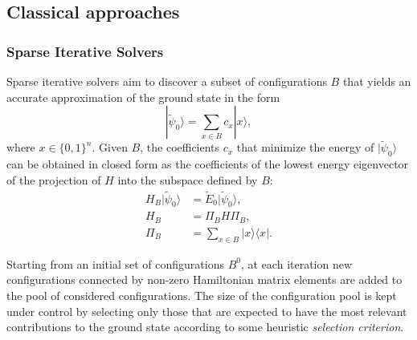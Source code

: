 \documentclass[
  reprint,            %
  amsmath,amssymb,
  aps,
  superscriptaddress, %
  longbibliography
]{revtex4-2}
\theoremstyle{definition}
\begin{document}
\subsection{Classical approaches}
\label{sec:classical_approaches}


\subsubsection{Sparse Iterative Solvers}
\label{sec:sis_intro}

Sparse iterative solvers aim to discover a subset of configurations $B$ that yields an accurate approximation of the ground state in the form
\begin{equation}
    |\tilde{\psi}_0\rangle = \sum_{x \in B} c_x | x\rangle,
\end{equation}
where $x\in\{0, 1\}^n$. Given $B$, the coefficients $c_x$ that minimize the energy of $|\tilde{\psi}_0\rangle$ can be obtained in closed form as the coefficients of the lowest energy eigenvector of the projection of $H$ into the subspace defined by $B$:
\begin{equation}
\begin{split}
    H_B  |\tilde{\psi}_0\rangle & = \tilde{E}_0  |\tilde{\psi}_0\rangle,\\
    H_B & = \Pi_B H \Pi_B, \\
    \Pi_B & = \sum_{x\in B} |x\rangle \langle x|.
\end{split}
\end{equation}

Starting from an initial set of configurations $B^0$, at each iteration new configurations connected by non-zero Hamiltonian matrix elements are added to the pool of considered configurations. The size of the configuration pool is kept under control by selecting only those that are expected to have the most relevant contributions to the ground state according to some heuristic \textit{selection criterion}.
\end{document}
